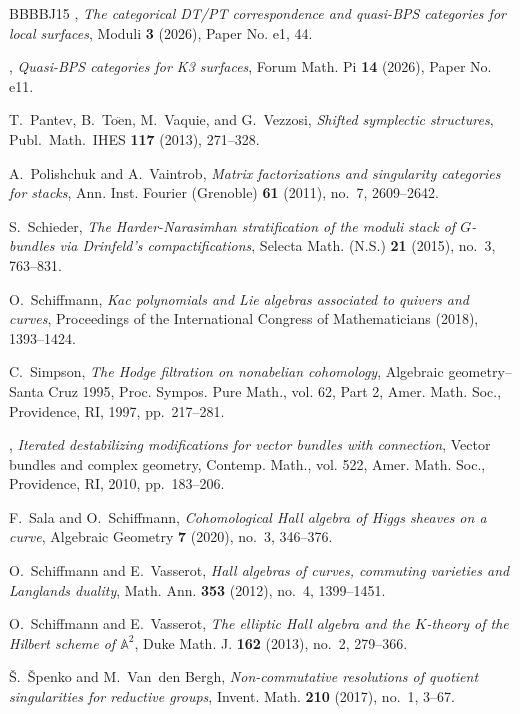 \documentclass [11pt,oneside,a4paper,mathscr]{amsart}
\theoremstyle{definition}
\begin{document}
\begin{thebibliography}{BBBBJ15}
\bysame, \emph{The categorical {DT}/{PT} correspondence and quasi-{BPS} categories for local surfaces}, Moduli \textbf{3} (2026), Paper No. e1, 44.

\bysame, \emph{Quasi-{BPS} categories for {K}3 surfaces}, Forum Math. Pi \textbf{14} (2026), Paper No. e11.

T.~Pantev, B.~To$\ddot{\textrm{e}}$n, M.~Vaquie, and G.~Vezzosi, \emph{Shifted symplectic structures}, Publ.~Math.~IHES \textbf{117} (2013), 271--328.

A.~Polishchuk and A.~Vaintrob, \emph{Matrix factorizations and singularity categories for stacks}, Ann. Inst. Fourier (Grenoble) \textbf{61} (2011), no.~7, 2609--2642.

S.~Schieder, \emph{The {H}arder-{N}arasimhan stratification of the moduli stack of {$G$}-bundles via {D}rinfeld's compactifications}, Selecta Math. (N.S.) \textbf{21} (2015), no.~3, 763--831.

O.~Schiffmann, \emph{Kac polynomials and {L}ie algebras associated to quivers and curves}, Proceedings of the International Congress of Mathematicians (2018), 1393--1424.

C.~Simpson, \emph{The {H}odge filtration on nonabelian cohomology}, Algebraic geometry--{S}anta {C}ruz 1995, Proc. Sympos. Pure Math., vol. 62, Part 2, Amer. Math. Soc., Providence, RI, 1997, pp.~217--281.

\bysame, \emph{Iterated destabilizing modifications for vector bundles with connection}, Vector bundles and complex geometry, Contemp. Math., vol. 522, Amer. Math. Soc., Providence, RI, 2010, pp.~183--206.

F.~Sala and O.~Schiffmann, \emph{Cohomological {H}all algebra of {H}iggs sheaves on a curve}, Algebraic Geometry \textbf{7} (2020), no.~3, 346--376.

O.~Schiffmann and E.~Vasserot, \emph{Hall algebras of curves, commuting varieties and {L}anglands duality}, Math. Ann. \textbf{353} (2012), no.~4, 1399--1451.

O.~Schiffmann and E.~Vasserot, \emph{The elliptic {H}all algebra and the {$K$}-theory of the {H}ilbert scheme of {$\mathbb{A}^2$}}, Duke Math. J. \textbf{162} (2013), no.~2, 279--366.

{\v S}.~{\v S}penko and M.~{V}an~den {B}ergh, \emph{Non-commutative resolutions of quotient singularities for reductive groups}, Invent. Math. \textbf{210} (2017), no.~1, 3--67.


\end{thebibliography}
\end{document}
